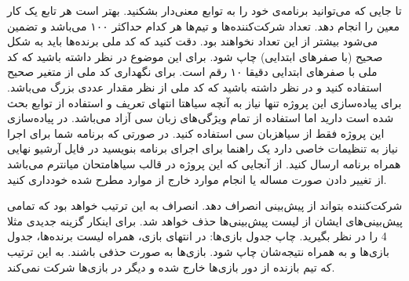 \documentclass[../main.tex]{subfiles}
\begin{document}
     تا جایی که می‌توانید برنامه‌ی خود را به توابع معنی‌دار بشکنید. بهتر است هر تابع یک کار معین را انجام دهد.
     تعداد شرکت‌کننده‌ها و تیم‌ها هر کدام حداکثر ۱۰۰ می‌باشد و تضمین می‌شود بیشتر از این تعداد نخواهند بود.
     دقت کنید که کد ملی برنده‌ها باید به شکل صحیح (با صفرهای ابتدایی) چاپ شود. برای این موضوع در نظر داشته باشید که کد ملی با صفرهای ابتدایی دقیقا ۱۰ رقم است.
     برای نگهداری کد ملی از متغیر صحیح استفاده کنید و در نظر داشته باشید که کد ملی از نظر مقدار عددی بزرگ می‌باشد.
     برای پیاده‌سازی این پروژه تنها نیاز به آنچه ‌سیاه{تا انتهای تعریف و استفاده از توابع} بحث شده است دارید اما استفاده از تمام ویژگی‌های زبان سی آزاد می‌باشد.
     در پیاده‌سازی این پروژه فقط از ‌سیاه{زبان سی} استفاده کنید. در صورتی که برنامه شما برای اجرا نیاز به تنظیمات خاصی دارد یک راهنما برای اجرای برنامه بنویسید در فایل آرشیو نهایی همراه برنامه ارسال کنید.
     از آنجایی که این پروژه در قالب ‌سیاه{امتحان میانترم} می‌باشد از تغییر دادن صورت مساله یا انجام موارد خارج از موارد مطرح شده خودداری کنید.


     شرکت‌کننده بتواند از پیش‌بینی انصراف دهد. انصراف به این ترتیب خواهد بود که تمامی پیش‌بینی‌های ایشان از لیست پیش‌بینی‌ها حذف خواهد شد. برای اینکار گزینه جدیدی مثلا 4 را در نظر بگیرید.
     چاپ جدول بازی‌ها: در انتهای بازی، همراه لیست برنده‌ها، جدول بازی‌ها و به همراه نتیجه‌شان چاپ شود.
     بازی‌ها به صورت حذفی باشند. به این ترتیب که تیم بازنده از دور بازی‌ها خارج شده و دیگر در بازی‌ها شرکت نمی‌کند.
\end{document}
